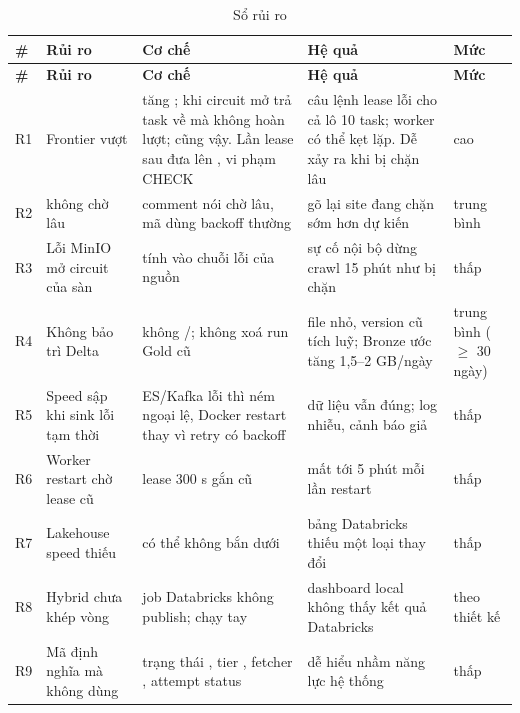 \begin{xltabular}{\linewidth}{@{}C{7mm}L{34mm}Y L{34mm}C{14mm}@{}}
  \caption{Sổ rủi ro}\label{tab:risks}\\
  \toprule
  \textbf{\#} & \textbf{Rủi ro} & \textbf{Cơ chế} & \textbf{Hệ quả} & \textbf{Mức} \\
  \midrule
  \endfirsthead
  \toprule \textbf{\#} & \textbf{Rủi ro} & \textbf{Cơ chế} & \textbf{Hệ quả} & \textbf{Mức} \\ \midrule
  \endhead
  R1 & Frontier vượt  &  tăng ; khi circuit mở  trả task về  mà không hoàn lượt;  cũng vậy. Lần lease sau đưa  lên , vi phạm CHECK & câu lệnh lease lỗi cho cả lô 10 task; worker có thể kẹt lặp. Dễ xảy ra khi bị chặn lâu & cao \\
  R2 &  không chờ lâu & comment  nói chờ lâu, mã dùng backoff thường & gõ lại site đang chặn sớm hơn dự kiến & trung bình \\
  R3 & Lỗi MinIO mở circuit của sàn &  tính vào chuỗi lỗi của nguồn & sự cố nội bộ dừng crawl 15 phút như bị chặn & thấp \\
  R4 & Không bảo trì Delta & không /; không xoá run Gold cũ & file nhỏ, version cũ tích luỹ; Bronze ước tăng 1,5--2 GB/ngày & trung bình ($\ge$ 30 ngày) \\
  R5 & Speed sập khi sink lỗi tạm thời & ES/Kafka lỗi thì ném ngoại lệ, Docker restart thay vì retry có backoff & dữ liệu vẫn đúng; log nhiễu, cảnh báo giả & thấp \\
  R6 & Worker restart chờ lease cũ & lease 300 s gắn  cũ & mất tới 5 phút mỗi lần restart & thấp \\
  R7 & Lakehouse speed thiếu  &  có thể không bắn dưới  & bảng Databricks thiếu một loại thay đổi & thấp \\
  R8 & Hybrid chưa khép vòng & job Databricks không publish;  chạy tay & dashboard local không thấy kết quả Databricks & theo thiết kế \\
  R9 & Mã định nghĩa mà không dùng & trạng thái , tier , fetcher , attempt status  & dễ hiểu nhầm năng lực hệ thống & thấp \\
  \bottomrule
\end{xltabular}

